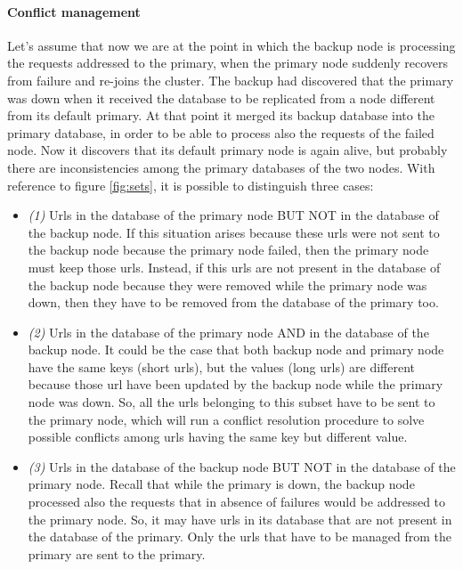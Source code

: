 \documentclass{article}
\begin{document}
\paragraph{Conflict management} Let's assume that now we are at the point in which the backup node is processing the requests addressed to the  primary, when the primary node suddenly recovers from failure and re-joins the cluster. The backup had discovered that the primary was down when it received the database to be replicated from a node different from its default primary. At that point it merged its backup database into the primary database, in order to be able to process also the requests of the failed node. Now it discovers that its default primary node is again alive, but probably there are inconsistencies among the primary databases of the two nodes. With reference to figure \ref{fig:sets}, it is possible to distinguish three cases:
\begin{itemize}
\item \textit{(1)} Urls in the database of the primary node BUT NOT in the database of the backup node. If this situation arises because these urls were not sent to the backup node because the primary node failed, then the primary node must keep those urls. Instead, if this urls are not present in the database of the backup node because they were removed while the primary node was down, then they have to be removed from the database of the primary too.
\item \textit{(2)} Urls in the database of the primary node AND in the database of the backup node. It could be the case that both backup node and primary node have the same keys (short urls), but the values (long urls) are different because those url have been updated by the backup node while the primary node was down. So, all the urls belonging to this subset have to be sent to the primary node, which will run a conflict resolution procedure to solve possible conflicts among urls having the same key but different value.
\item \textit{(3)} Urls in the database of the backup node BUT NOT in the database of the primary node. Recall that while the primary is down, the backup node processed also the requests that in absence of failures would be addressed to the primary node. So, it may have urls in its database that are not present in the database of the primary. Only the urls that have to be managed from the primary are sent to the primary.
\end{itemize}
\end{document}
